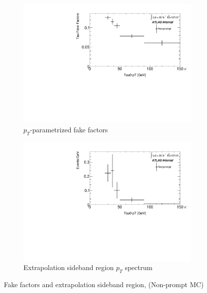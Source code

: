 \documentclass[11pt]{article}
\begin{document}
	\begin{figure}[H]
	\centering
	\begin{subfigure}{.5\textwidth}
	\centering
	\includegraphics[width=0.95\linewidth]{figures/FakesEstimate_data_pp8_nonallhad_new_scaledHists/FF_Faketau_Nonprompt.pdf}
  	\caption{$p_T$-parametrized fake factors}
  	\label{fig:sub1}
	\end{subfigure}%
	\begin{subfigure}{.5\textwidth}
	\centering
	\includegraphics[width=0.95\linewidth]{figures/FakesEstimate_data_pp8_nonallhad_new_scaledHists/hist_Extrapolation_Nonprompt.pdf}
	\caption{Extrapolation sideband region $p_T$ spectrum}
	\end{subfigure}
	\caption{Fake factors and extrapolation sideband region, (Non-prompt MC)}
	\end{figure}
	
\end{document}
